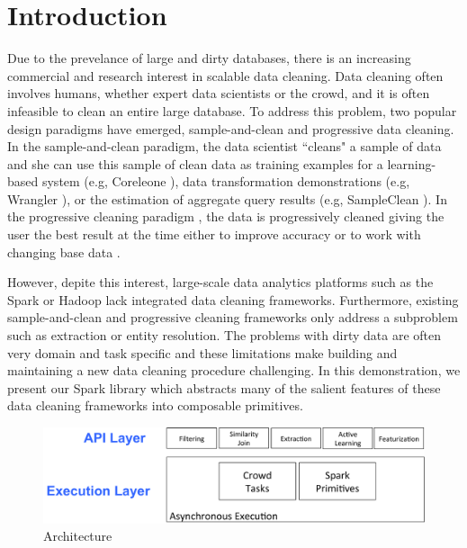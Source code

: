 \section{Introduction}\label{sec:intro}
Due to the prevelance of large and dirty databases, there is an increasing commercial and research interest
in scalable data cleaning.
Data cleaning often involves humans, whether expert data scientists or the crowd, and it is often infeasible to clean an entire large database. 
To address this problem, two popular design paradigms have emerged, sample-and-clean and progressive data cleaning. 
In the sample-and-clean paradigm, the data scientist ``cleans" a sample of data and she can use this sample of clean data as training examples for a learning-based system (e.g, Coreleone \cite{DBLP:conf/sigmod/GokhaleDDNRSZ14}), data transformation demonstrations (e.g, Wrangler \cite{DBLP:conf/uist/GuoKHH11}), or the estimation of aggregate query results (e.g, SampleClean \cite{wang1999sample}).
In the progressive cleaning paradigm \cite{altowim2014progressive}, the data is progressively cleaned giving the user the best result at the time either to improve accuracy or to work with changing base data \cite{volkovs2014continuous}.

However, depite this interest, large-scale data analytics platforms such as the Spark or Hadoop lack integrated data cleaning frameworks.
Furthermore, existing sample-and-clean and progressive cleaning frameworks only address a subproblem such as extraction or entity resolution.
The problems with dirty data are often very domain and task specific and these limitations make building and maintaining a new data cleaning procedure challenging.
In this demonstration, we present our Spark library \projx which abstracts many of the salient features of these data cleaning frameworks into composable primitives.

\begin{figure}[tup]\label{fig:arch}\vspace{-.5em}
\centering
\includegraphics[width=\columnwidth]{figs/architecture.pdf}\vspace{-1em}
\caption{\saqpplus Architecture \label{fig:sample}}

\end{figure}

